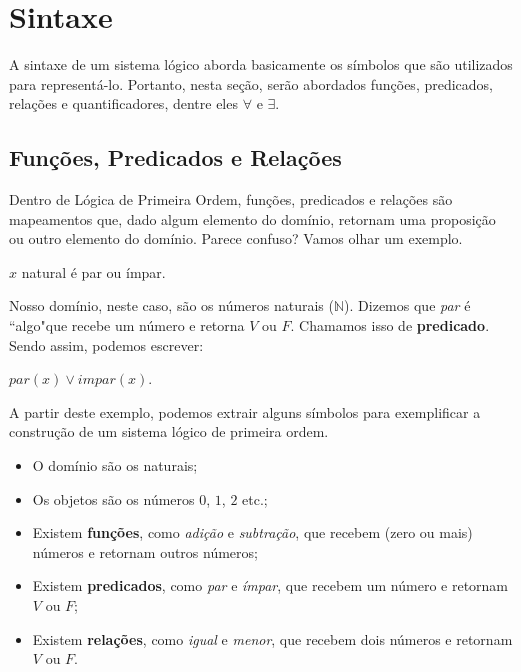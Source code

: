 \section{Sintaxe}

    A sintaxe de um sistema lógico aborda basicamente os símbolos que são utilizados para representá-lo. Portanto, nesta seção, serão abordados funções, predicados, relações e quantificadores, dentre eles $\forall$ e $\exists$.

    \subsection{Funções, Predicados e Relações}

        Dentro de Lógica de Primeira Ordem, funções, predicados e relações são mapeamentos que, dado algum elemento do domínio, retornam uma proposição ou outro elemento do domínio. Parece confuso? Vamos olhar um exemplo.

        \begin{center}
            $x$ natural é par ou ímpar.            
        \end{center}

        Nosso domínio, neste caso, são os números naturais ($\mathbb{N}$). Dizemos que \textit{par} é ``algo"\space que recebe um número e retorna $V$ ou $F$. Chamamos isso de \textbf{predicado}. Sendo assim, podemos escrever:

        \begin{center}
            $par(x) \lor impar(x)$.
        \end{center}

        A partir deste exemplo, podemos extrair alguns símbolos para exemplificar a construção de um sistema lógico de primeira ordem.

        \begin{itemize}
            \item O domínio são os naturais;
            \item Os objetos são os números $0$, $1$, $2$ etc.;
            \item Existem \textbf{funções}, como \textit{adição} e \textit{subtração}, que recebem (zero ou mais) números e retornam outros números;
            \item Existem \textbf{predicados}, como \textit{par} e \textit{ímpar}, que recebem um número e retornam $V$ ou $F$;
            \item Existem \textbf{relações}, como \textit{igual} e \textit{menor}, que recebem dois números e retornam $V$ ou $F$.
        \end{itemize}

